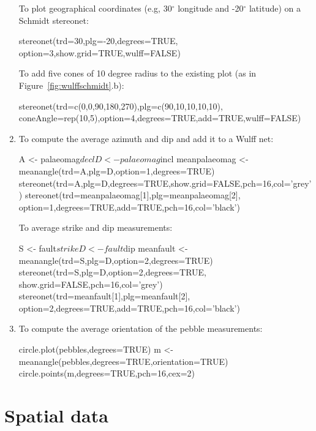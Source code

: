 \begin{enumerate}
To plot geographical coordinates (e.g, 30$^\circ$ longitude and
-20$^\circ$ latitude) on a Schmidt stereonet:

\begin{script}
stereonet(trd=30,plg=-20,degrees=TRUE,
          option=3,show.grid=TRUE,wulff=FALSE)
\end{script}

To add five cones of 10 degree radius to the existing plot (as in
Figure~\ref{fig:wulffschmidt}.b):

\begin{script}[firstnumber=3]
stereonet(trd=c(0,0,90,180,270),plg=c(90,10,10,10,10),
          coneAngle=rep(10,5),option=4,degrees=TRUE,add=TRUE,wulff=FALSE)
\end{script}

\item To compute the average azimuth and dip and add it to a Wulff net:

\begin{script}
A <- palaeomag$decl
D <- palaeomag$incl
meanpalaeomag <- meanangle(trd=A,plg=D,option=1,degrees=TRUE)
stereonet(trd=A,plg=D,degrees=TRUE,show.grid=FALSE,pch=16,col='grey')
stereonet(trd=meanpalaeomag[1],plg=meanpalaeomag[2],
          option=1,degrees=TRUE,add=TRUE,pch=16,col='black')
\end{script}

To average strike and dip measurements:

\begin{script}
S <- fault$strike
D <- fault$dip
meanfault <- meanangle(trd=S,plg=D,option=2,degrees=TRUE)
stereonet(trd=S,plg=D,option=2,degrees=TRUE,
          show.grid=FALSE,pch=16,col='grey')
stereonet(trd=meanfault[1],plg=meanfault[2],
          option=2,degrees=TRUE,add=TRUE,pch=16,col='black')
\end{script}

\item To compute the average orientation of the pebble measurements:

\begin{script}
circle.plot(pebbles,degrees=TRUE)
m <- meanangle(pebbles,degrees=TRUE,orientation=TRUE)
circle.points(m,degrees=TRUE,pch=16,cex=2)
\end{script}  

\end{enumerate}

\section{Spatial data}
\label{sec:R-spatial}

